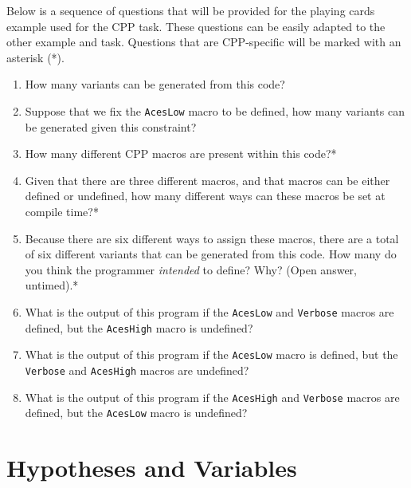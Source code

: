 \documentclass[11pt]{article}
\begin{document}
	Below is a sequence of questions that will be provided for the playing cards
	example used for the CPP task.  These questions can be easily adapted to the
	other example and task.  Questions that are CPP-specific will be marked with an
	asterisk (*).
	
	\begin{enumerate}[label=Q\arabic*:,leftmargin=*]%
		
		\item How many variants can be generated from this code?
		
		\item Suppose that we fix the \texttt{AcesLow} macro to be defined, how many
		variants can be generated given this constraint?
		
		\item How many different CPP macros are present within this code?*
		
		\item Given that there are three different macros, and that macros can be
		either defined or undefined, how many different ways can these macros be set at
		compile time?*
		
		\item Because there are six different ways to assign these macros, there are
		a total of six different variants that can be generated from this code.  How
		many do you think the programmer \emph{intended} to define?  Why?  (Open
		answer, untimed).*
		
		\item What is the output of this program if the \texttt{AcesLow} and
		\texttt{Verbose} macros are defined, but the \texttt{AcesHigh} macro is
		undefined?
		
		\item What is the output of this program if the \texttt{AcesLow} macro is
		defined, but the \texttt{Verbose} and \texttt{AcesHigh} macros are undefined?
		
		\item What is the output of this program if the \texttt{AcesHigh} and
		\texttt{Verbose} macros are defined, but the \texttt{AcesLow} macro is
		undefined?
		
	\end{enumerate}
	
	
	\section{Hypotheses and Variables}
	\label{sec:hypotheses}
	
\end{document}
